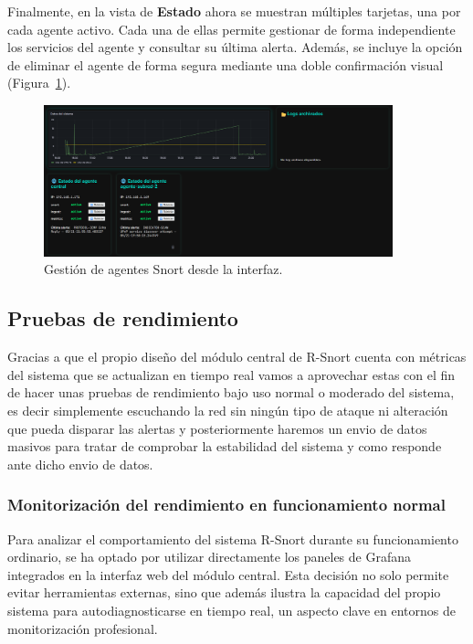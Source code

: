 \documentclass[11pt,a4paper,twoside]{report}
\begin{document}
\newpage

Finalmente, en la vista de \textbf{Estado} ahora se muestran múltiples tarjetas, una por cada agente activo. Cada una de ellas permite gestionar de forma independiente los servicios del agente y consultar su última alerta. Además, se incluye la opción de eliminar el agente de forma segura mediante una doble confirmación visual (Figura~\ref{fig:estado-multiple-agentes}).

\begin{figure}[H]
	\centering
	\includegraphics[width=0.9\textwidth]{configuracion/10.png}
	\caption{Gestión de agentes Snort desde la interfaz.}
	\label{fig:estado-multiple-agentes}
\end{figure}

\subsection{Pruebas de rendimiento}

Gracias a que el propio diseño del módulo central de R-Snort cuenta con métricas del sistema que se actualizan en tiempo real vamos a aprovechar estas con el fin de hacer unas pruebas de rendimiento bajo uso normal o moderado del sistema, es decir simplemente escuchando la red sin ningún tipo de ataque ni alteración que pueda disparar las alertas y posteriormente haremos un envio de datos masivos para tratar de comprobar la estabilidad del sistema y como responde ante dicho envio de datos.

\subsubsection{Monitorización del rendimiento en funcionamiento normal}

Para analizar el comportamiento del sistema R-Snort durante su funcionamiento ordinario, se ha optado por utilizar directamente los paneles de Grafana integrados en la interfaz web del módulo central. Esta decisión no solo permite evitar herramientas externas, sino que además ilustra la capacidad del propio sistema para autodiagnosticarse en tiempo real, un aspecto clave en entornos de monitorización profesional.
\end{document}
